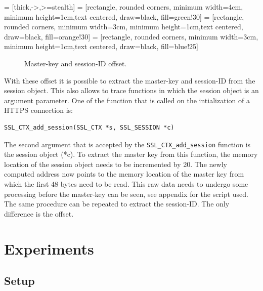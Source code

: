 \documentclass[12pt, a4paper]{report}
\begin{document}
 = [thick,->,>=stealth]
 = [rectangle, rounded corners, minimum width=4cm, minimum height=1cm,text centered, draw=black, fill=green!30]
 = [rectangle, rounded corners, minimum width=3cm, minimum height=1cm,text centered, draw=black, fill=orange!30]
 = [rectangle, rounded corners, minimum width=3cm, minimum height=1cm,text centered, draw=black, fill=blue!25]

\begin{figure}[!h]
\centering
{}
\caption{Master-key and session-ID offset.}
\end{figure}
\noindent With these offset it is possible to extract the master-key and session-ID from the session object. This also allows to trace functions in which the session object is an argument parameter. 
\newline
\newline
One of the function that is called on the intialization of a HTTPS connection is:
\begin{lstlisting}[frame=single, breaklines=true]
SSL_CTX_add_session(SSL_CTX *s, SSL_SESSION *c)
\end{lstlisting}
The second argument that is accepted by the \texttt{SSL\_CTX\_add\_session} function is the session object (*c). To extract the master key from this function, the memory location of the session object needs to be incremented by 20. The newly computed address now points to the memory location of the master key from which the first 48 bytes need to be read. This raw data needs to undergo some processing before the master-key can be seen, see appendix for the script used. The same procedure can be repeated to extract the session-ID. The only difference is the offset. 


\chapter{Experiments}
\section{Setup}
\end{document}
